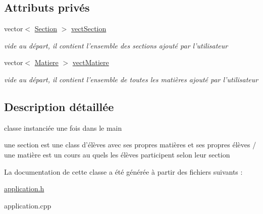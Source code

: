 \subsection*{Attributs privés}
\begin{DoxyCompactItemize}
\item 
\hypertarget{class_application_a689a25902c2e34e61bdd122d4c92d941}{vector$<$ \hyperlink{class_section}{Section} $>$ \hyperlink{class_application_a689a25902c2e34e61bdd122d4c92d941}{vect\+Section}}\label{class_application_a689a25902c2e34e61bdd122d4c92d941}

\begin{DoxyCompactList}\small\item\em vide au départ, il contient l'ensemble des sections ajouté par l'utilisateur \end{DoxyCompactList}\item 
\hypertarget{class_application_ac5a9a7ed9aab9411814d9cd53af9175d}{vector$<$ \hyperlink{class_matiere}{Matiere} $>$ \hyperlink{class_application_ac5a9a7ed9aab9411814d9cd53af9175d}{vect\+Matiere}}\label{class_application_ac5a9a7ed9aab9411814d9cd53af9175d}

\begin{DoxyCompactList}\small\item\em vide au départ, il contient l'ensemble de toutes les matières ajouté par l'utilisateur \end{DoxyCompactList}\end{DoxyCompactItemize}


\subsection{Description détaillée}
classe instanciée une fois dans le main 

une section est une class d'élèves avec ses propres matières et ses propres élèves / une matière est un cours au quels les élèves participent selon leur section 

La documentation de cette classe a été générée à partir des fichiers suivants \+:\begin{DoxyCompactItemize}
\item 
\hyperlink{application_8h}{application.\+h}\item 
application.\+cpp\end{DoxyCompactItemize}
